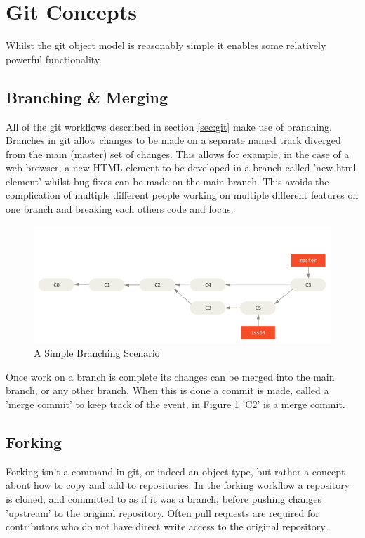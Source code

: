 \documentclass[11pt]{book}
\begin{document}
\section{Git Concepts}
Whilst the git object model is reasonably simple it enables some relatively powerful functionality.

\subsection{Branching \& Merging}
All of the git workflows described in section \ref{sec:git} make use of branching. Branches in git allow changes to be made on a separate named track diverged from the main (master) set of changes. This allows for example, in the case of a web browser, a new HTML element to be developed in a branch called 'new-html-element' whilst bug fixes can be made on the main branch. This avoids the complication of multiple different people working on multiple different features on one branch and breaking each others code and focus.

\begin{figure}[h]
	\centering
	\includegraphics[width=\textwidth]{images/basicbranching}
	\caption{A Simple Branching Scenario \cite{gitbasicbranching}}
	\label{fig:gitbranching}
\end{figure} 

Once work on a branch is complete its changes can be merged into the main branch, or any other branch. When this is done a commit is made, called a 'merge commit' to keep track of the event, in Figure \ref{fig:gitbranching} 'C2' is a merge commit.

\subsection{Forking}
Forking isn't a command in git, or indeed an object type, but rather a concept about how to copy and add to repositories. In the forking workflow \cite{forkingworkflow} a repository is cloned, and committed to as if it was a branch, before pushing changes 'upstream' to the original repository. Often pull requests are required for contributors who do not have direct write access to the original repository.
\end{document}
